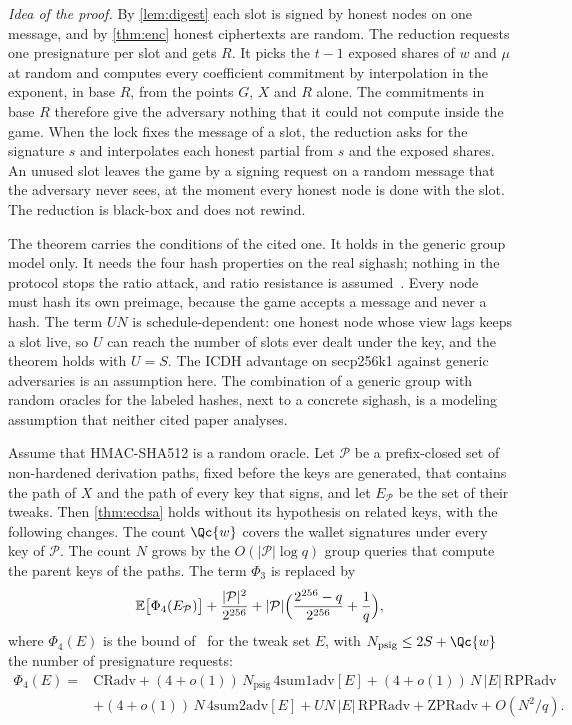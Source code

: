 \emph{Idea of the proof.} By \cref{lem:digest} each slot is signed by honest nodes on one message, and by \cref{thm:enc} honest ciphertexts are random. The reduction requests one presignature per slot and gets $R$. It picks the $t-1$ exposed shares of $w$ and $\mu$ at random and computes every coefficient commitment by interpolation in the exponent, in base $R$, from the points $G$, $X$ and $R$ alone. The commitments in base $R$ therefore give the adversary nothing that it could not compute inside the game. When the lock fixes the message of a slot, the reduction asks for the signature $s$ and interpolates each honest partial from $s$ and the exposed shares. An unused slot leaves the game by a signing request on a random message that the adversary never sees, at the moment every honest node is done with the slot. The reduction is black-box and does not rewind.

The theorem carries the conditions of the cited one. It holds in the generic group model only. It needs the four hash properties on the real sighash; nothing in the protocol stops the ratio attack, and ratio resistance is assumed~\cite[p.~26]{GS21}. Every node must hash its own preimage, because the game accepts a message and never a hash. The term $U N$ is schedule-dependent: one honest node whose view lags keeps a slot live, so $U$ can reach the number of slots ever dealt under the key, and the theorem holds with $U = S$. The ICDH advantage on secp256k1 against generic adversaries is an assumption here. The combination of a generic group with random oracles for the labeled hashes, next to a concrete sighash, is a modeling assumption that neither cited paper analyses.

\begin{corollary}\label{cor:bip32}
Assume that HMAC-SHA512 is a random oracle. Let $\mathcal{P}$ be a prefix-closed set of non-hardened derivation paths, fixed before the keys are generated, that contains the path of $X$ and the path of every key that signs, and let $E_{\mathcal{P}}$ be the set of their tweaks. Then \cref{thm:ecdsa} holds without its hypothesis on related keys, with the following changes. The count $\Qc{w}$ covers the wallet signatures under every key of $\mathcal{P}$. The count $N$ grows by the $O(|\mathcal{P}| \log q)$ group queries that compute the parent keys of the paths. The term $\Phi_3$ is replaced by
\[
  \mathbb{E}\bigl[\Phi_4(E_{\mathcal{P}})\bigr] + \frac{|\mathcal{P}|^2}{2^{256}} + |\mathcal{P}|\Bigl(\frac{2^{256} - q}{2^{256}} + \frac{1}{q}\Bigr),
\]
where $\Phi_4(E)$ is the bound of~\cite[Theorem~4]{GS21} for the tweak set $E$, with $N_{\mathrm{psig}} \le 2S + \Qc{w}$ the number of presignature requests:
\begin{align*}
  \Phi_4(E) ={}& \mathrm{CRadv} + (4 + o(1))\,N_{\mathrm{psig}}\,\mathrm{4sum1adv}[E] + (4 + o(1))\,N\,|E|\,\mathrm{RPRadv} \\
  &+ (4 + o(1))\,N\,\mathrm{4sum2adv}[E] + U N\,|E|\,\mathrm{RPRadv} + \mathrm{ZPRadv} + O(N^2/q) .
\end{align*}
\end{corollary}

